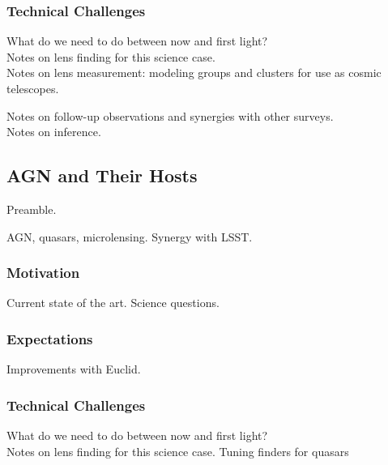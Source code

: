\documentclass{article}
\begin{document}
\subsubsection{Technical Challenges}

What do we need to do between now and first light?\\

Notes on lens finding for this science case.\\

Notes on lens measurement: modeling groups and clusters for use as cosmic
telescopes.

Notes on follow-up observations and synergies with other surveys.\\

Notes on inference.\\



\subsection{AGN and Their Hosts}



Preamble.

AGN, quasars, microlensing.
Synergy with LSST.

\subsubsection{Motivation}
Current state of the art. Science questions.\\

\subsubsection{Expectations}
Improvements with Euclid.\\

\subsubsection{Technical Challenges}

What do we need to do between now and first light?\\

Notes on lens finding for this science case. Tuning finders for quasars\\
\end{document}
